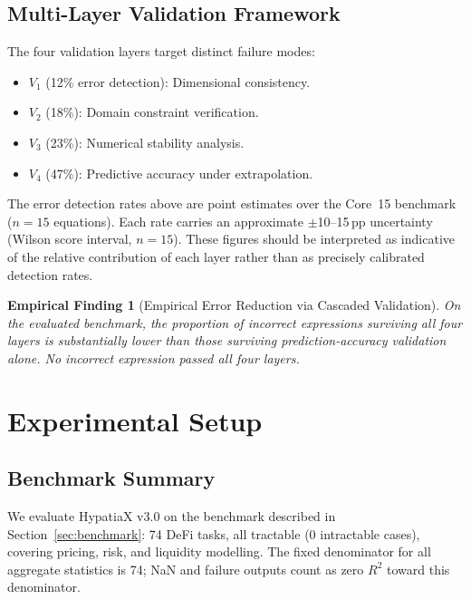 \documentclass[twoside,11pt]{article}
\newcommand{\Rsq}{R^{2}}
\newtheorem{finding}{Empirical Finding}
\begin{document}
\subsection{Multi-Layer Validation Framework}\label{subsec:multilayer-validation-framework}
\label{sec:validation_detail}

The four validation layers target distinct failure modes:

\begin{itemize}
\item $V_1$ (12\% error detection): Dimensional consistency.
\item $V_2$ (18\%): Domain constraint verification.
\item $V_3$ (23\%): Numerical stability analysis.
\item $V_4$ (47\%): Predictive accuracy under extrapolation.
\end{itemize}

\begin{remark}
\label{rem:validation_ci}
The error detection rates above are point estimates over the Core~15 benchmark
($n=15$ equations).  Each rate carries an approximate $\pm$10--15\,pp
uncertainty (Wilson score interval, $n=15$).  These figures should be
interpreted as indicative of the relative contribution of each layer rather
than as precisely calibrated detection rates.
\end{remark}

\begin{finding}[Empirical Error Reduction via Cascaded Validation]
\label{prop:validation_reduction}
On the evaluated benchmark, the proportion of incorrect expressions surviving
all four layers is substantially lower than those surviving prediction-accuracy
validation alone.  No incorrect expression passed all four layers.
\end{finding}

\section{Experimental Setup}
\label{sec:setup}

\subsection{Benchmark Summary}\label{subsec:benchmark-summary}
\label{sec:setup_summary}

We evaluate HypatiaX v3.0 on the benchmark described in Section~\ref{sec:benchmark}:
74 DeFi tasks, all tractable (0 intractable cases), covering pricing, risk, and
liquidity modelling.  The fixed denominator for all aggregate statistics is 74;
NaN and failure outputs count as zero $\Rsq$ toward this denominator.
\end{document}
